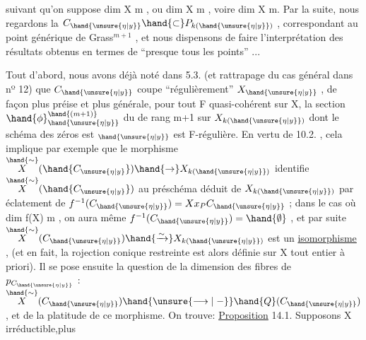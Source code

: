 
suivant qu'on suppose  dim X \hand{$\geqslant$} m , ou  dim X \hand{$\leqslant$} m , voire dim X \hand{$<$} m.
Par la suite, nous regardons la $C_{\hand{\unsure{\eta|y}}}\hand{\subset} P_{k(\hand{\unsure{\eta|y}})}$ , correspondant au point
générique  de  Grass$^{m+1}$ , et nous dispensons  de faire l'interprétation
des résultats obtenus en termes de  ``presque tous les points'' ...

Tout d'abord, nous avons déjà noté dans 5.3. (et rattrapage du
cas général dans nº 12)  que $C_{\hand{\unsure{\eta|y}}}$  coupe ``régulièrement'' $X_{\hand{\unsure{\eta|y}}}$ , de façon
plus préise et plus générale, pour tout F quasi-cohérent sur X,
la section $\hand{\phi}_{\hand{\unsure{\eta|y}}}^{\hand{(m+1)}}$ du  de rang  m+1  sur  $X_{k(\hand{\unsure{\eta|y}})}$  dont le
schéma des zéros est $_{\hand{\unsure{\eta|y}}}$ \over{;}{\unsure{;|,}} est F-régulière. En vertu de 10.2. , cela
implique par exemple que le morphisme  $\overset{\hand{\sim}}{X}(\hand{C_{\unsure{\eta|y}}})\hand{\to} X_{k(\hand{\unsure{\eta|y}})}$ identifie $\overset{\hand{\sim}}{X}(\hand{C_{\unsure{\eta|y}}})$ au préschéma
déduit de $X_{k(\hand{\unsure{\eta|y}})}$ par éclatement de $f^{-1}(C_{\hand{\unsure{\eta|y}}})= Xx_P C_{\hand{\unsure{\eta|y}}}$ ;   dans le cas
où  dim f(X) \hand{$\leqslant$} m ,  on  aura même  $f^{-1}(C_{\hand{\unsure{\eta|y}}}) = \hand{\emptyset}$ , et  par suite
$\overset{\hand{\sim}}{X}(C_{\hand{\unsure{\eta|y}}}) \hand{\xrightarrow{\sim}} X_{k(\hand{\unsure{\eta|y}})}$  est un \uline{isomorphisme} , (et en fait, la rojection conique
restreinte  est alors définie sur X tout entier à priori). Il se pose
ensuite la question de la dimension des fibres de $p_{C_{\hand{\unsure{\eta|y}}}}$ : $\overset{\hand{\sim}}{X}(C_{\hand{\unsure{\eta|y}}}) \hand{\unsure{\longrightarrow|\relbar}} \hand{Q}(C_{\hand{\unsure{\eta|y}}})$,
et de la platitude de ce morphisme. On trouve:
\uline{Proposition} 14.1.   Supposons X irréductible,plus
